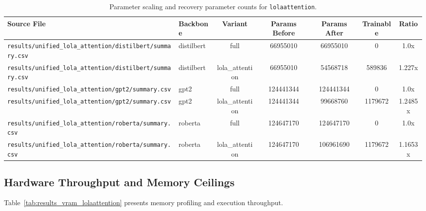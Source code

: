 \begin{table}[t]
\centering
\small
\begin{tabular}{llccccc}
\toprule
\textbf{Source File} & \textbf{Backbone} & \textbf{Variant} & \textbf{Params Before} & \textbf{Params After} & \textbf{Trainable} & \textbf{Ratio} \\
\midrule
\texttt{results/unified\_lola\_attention/distilbert/summary.csv} & distilbert & full & 66955010 & 66955010 & 0 & 1.0x \\
\texttt{results/unified\_lola\_attention/distilbert/summary.csv} & distilbert & lola\_attention & 66955010 & 54568718 & 589836 & 1.227x \\
\texttt{results/unified\_lola\_attention/gpt2/summary.csv} & gpt2 & full & 124441344 & 124441344 & 0 & 1.0x \\
\texttt{results/unified\_lola\_attention/gpt2/summary.csv} & gpt2 & lola\_attention & 124441344 & 99668760 & 1179672 & 1.2485x \\
\texttt{results/unified\_lola\_attention/roberta/summary.csv} & roberta & full & 124647170 & 124647170 & 0 & 1.0x \\
\texttt{results/unified\_lola\_attention/roberta/summary.csv} & roberta & lola\_attention & 124647170 & 106961690 & 1179672 & 1.1653x \\
\bottomrule
\end{tabular}
\caption{Parameter scaling and recovery parameter counts for \texttt{lolaattention}.}
\label{tab:results_params_lolaattention}
\end{table}

\subsection{Hardware Throughput and Memory Ceilings}
Table~\ref{tab:results_vram_lolaattention} presents memory profiling and execution throughput.

